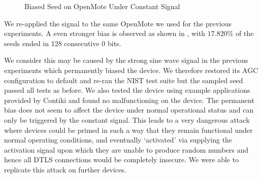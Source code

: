 \begin{figure}[!t]
\centering
{}
\hfil
{}
\caption{Biased Seed on OpenMote Under Constant Signal}
\label{ConstantSignalBiased}
\end{figure}



We re-applied the signal to the same OpenMote we used for the previous experiments. A even stronger bias is observed as shown in , with $17.820\%$ of the seeds ended in 128 consecutive $0$ bits.

We consider this may be caused by the strong sine wave signal in the previous experiments which permanently biased the device. We therefore restored its AGC configuration to default and re-ran the NIST test suite but the sampled seed passed all tests as before. We also tested the device using example applications provided by Contiki and found no malfunctioning on the device. The permanent bias does not seem to affect the device under normal operational status and can only be triggered by the constant signal. This leads to a very dangerous attack where devices could be primed in such a way that they remain functional under normal operating conditions, and eventually `activated' via supplying the activation signal upon which they are unable to produce random numbers and hence all DTLS connections would be completely insecure. We were able to replicate this attack on further devices.

